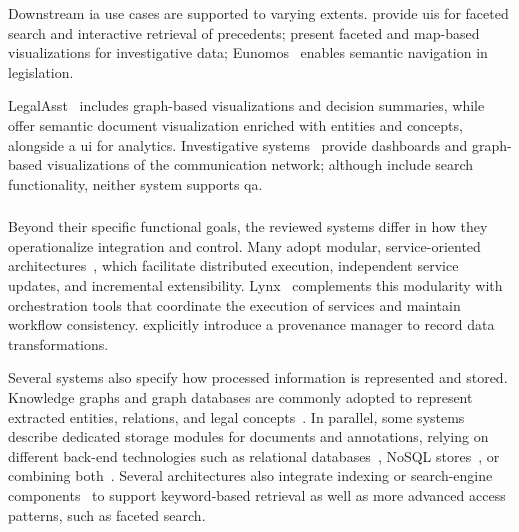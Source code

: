 Downstream \acl{ia} use cases are supported to varying extents. \textcite{human-ai-system-legal-precedent-search-china} provide \aclp{ui} for faceted search and interactive retrieval of precedents; \textcite{szekely2015building,kejriwal2017searchengine,kejriwal2018} present faceted and map-based visualizations for investigative data; Eunomos~\cite{boella2016eunomos} enables semantic navigation in legislation.

LegalAsst~\cite{HAN2024121052legalasst} includes graph-based visualizations and decision summaries, while \textcite{bellandi2025streamlining} offer semantic document visualization enriched with entities and concepts, alongside a \ac{ui} for analytics. Investigative systems~\cite{P_rez_2021,pirzada2024framework} provide dashboards and graph-based visualizations of the communication network; although \textcite{P_rez_2021} include search functionality, neither system supports \acl{qa}.



\subsubsection{}
Beyond their specific functional goals, the reviewed systems differ in how they operationalize integration and control. 
Many adopt modular, service-oriented architectures~\cite{buey2016,P_rez_2021,MorenoSchneider2021LynxCuration,RodriguezDoncel2019LynxDMP,bellandi2025streamlining,breit_legal_permits_2020}, which facilitate distributed execution, independent service updates, and incremental extensibility. 
Lynx~\cite{MorenoSchneider2021LynxCuration,RodriguezDoncel2019LynxDMP,bellandi2025streamlining,P_rez_2021} complements this modularity with orchestration tools that coordinate the execution of services and maintain workflow consistency. 
\textcite{breit_legal_permits_2020} explicitly introduce a provenance manager to record data transformations.

Several systems also specify how processed information is represented and stored. 
Knowledge graphs and graph databases are commonly adopted to represent extracted entities, relations, and legal concepts~\cite{amato2008,kejriwal2017searchengine,kejriwal2018,bellandi2025streamlining,boella2016eunomos,MorenoSchneider2021LynxCuration,breit_legal_permits_2020}. 
In parallel, some systems~\cite{bellandi2025streamlining,boella2016eunomos,P_rez_2021} describe dedicated storage modules for documents and annotations, relying on different back-end technologies such as relational databases~\cite{boella2016eunomos}, NoSQL stores~\cite{P_rez_2021,szekely2015building,kejriwal2017searchengine,kejriwal2018}, or combining both~\cite{bellandi2025streamlining}. 
Several architectures also integrate indexing or search-engine components~\cite{bellandi2025streamlining,szekely2015building,kejriwal2017searchengine,kejriwal2018,human-ai-system-legal-precedent-search-china} to support keyword-based retrieval as well as more advanced access patterns, such as faceted search.

